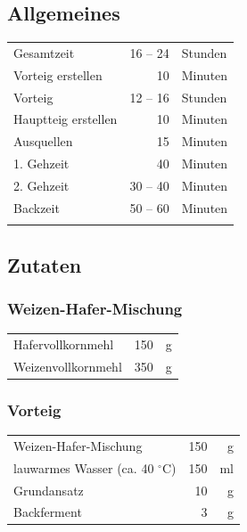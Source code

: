 \subsection*{Allgemeines}
\begin{tabular}{lrl}
    Gesamtzeit          & 16 --  24 & Stunden                       \\
    Vorteig erstellen   &        10 & Minuten                       \\
    Vorteig             &  12 -- 16 & Stunden                       \\
    Hauptteig erstellen &        10 & Minuten                       \\
    Ausquellen          &        15 & Minuten                       \\
    1. Gehzeit          &        40 & Minuten                       \\
    2. Gehzeit          &  30 -- 40 & Minuten                       \\
    Backzeit            &  50 -- 60 & Minuten                       \\
    &           & \cite[Seite 151 ]{Pokorny2016}
\end{tabular} 
\subsection*{Zutaten}

\subsubsection*{Weizen-Hafer-Mischung}
\begin{tabular}{lrr}
    Hafervollkornmehl                  & 150 &  g \\
    Weizenvollkornmehl                 & 350 &  g \\
\end{tabular} 

\subsubsection*{Vorteig}
\begin{tabular}{lrr}
    Weizen-Hafer-Mischung               & 150 &  g \\
    lauwarmes Wasser (ca. 40 $^\circ$C) & 150 & ml \\
    Grundansatz                         &  10 &  g \\
    Backferment                         &   3 &  g
\end{tabular} 

